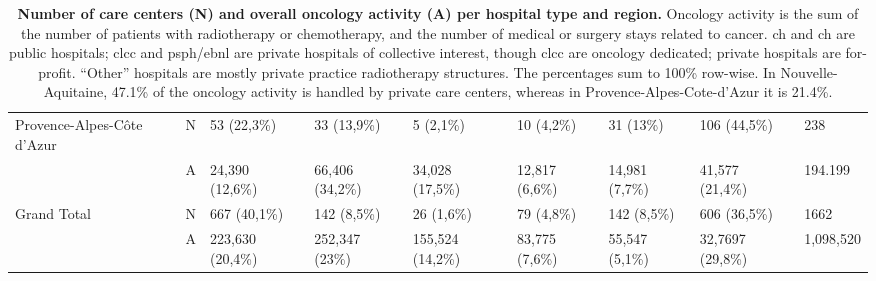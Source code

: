\begin{table}[H]
{\begin{tabular}{|l|l|l|l|l|l|l|l|l|}
            Provence-Alpes-Côte d'Azur                        & N               & 53 (22,3\%)                       & 33 (13,9\%)     & 5 (2,1\%)        &
            10 (4,2\%)                                        & 31 (13\%)       & 106 (44,5\%)                      & 238                                                                      \\
            ~                                                 & A               & 24,390 (12,6\%)                   & 66,406 (34,2\%) & 34,028 (17,5\%)  & 12,817
            (6,6\%)                                           & 14,981 (7,7\%)  & 41,577 (21,4\%)                   & 194.199                                                                  \\ \hline
            Grand Total                                       & N               & 667 (40,1\%)                      & 142 (8,5\%)     & 26 (1,6\%)       & 79 (4,8\%)     &
            142 (8,5\%)                                       & 606 (36,5\%)    & 1662                                                                                                         \\
            ~                                                 & A               & 223,630 (20,4\%)                  & 252,347 (23\%)  & 155,524 (14,2\%) & 83,775
            (7,6\%)                                           & 55,547 (5,1\%)  & 32,7697 (29,8\%)                  & 1,098,520                                                                \\ \hline
        \end{tabular}} \caption{ \textbf{Number of care centers (N) and overall
            oncology activity (A) per hospital type and region.} Oncology activity is
        the sum of the number of patients with radiotherapy or chemotherapy, and the
        number of medical or surgery stays related to cancer. \ac{ch} and \ac{ch}
        are public hospitals; \ac{clcc} and \ac{psph}/\ac{ebnl} are private
        hospitals of collective interest, though \acs{clcc} are oncology dedicated;
        private hospitals are for-profit. “Other” hospitals are mostly private
        practice radiotherapy structures. The percentages sum to 100\% row-wise. In
        Nouvelle-Aquitaine, 47.1\% of the oncology activity is handled by private
        care centers, whereas in Provence-Alpes-Cote-d'Azur it is 21.4\%. }
    \label{table:oncology-activity-per-region}
\end{table}

